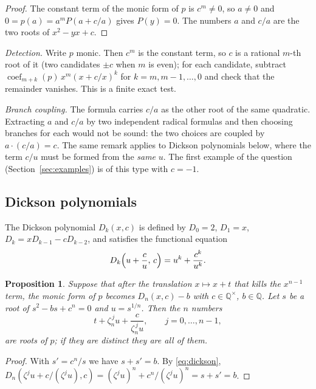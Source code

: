 \documentclass[11pt,a4paper]{article}
\newtheorem{proposition}[theorem]{Proposition}
\theoremstyle{definition}
\theoremstyle{remark}
\newcommand{\Q}{\mathbb{Q}}
\begin{document}
\begin{proof}
The constant term of the monic form of $p$ is $c^m\neq0$, so $a\neq0$ and
$0=p(a)=a^mP(a+c/a)$ gives $P(y)=0$.  The numbers $a$ and $c/a$ are the two roots of
$x^2-yx+c$.
\end{proof}

\emph{Detection.}  Write $p$ monic.  Then $c^m$ is the constant term, so $c$ is a
rational $m$-th root of it (two candidates $\pm c$ when $m$ is even); for each candidate,
subtract $\operatorname{coef}_{m+k}(p)\,x^m(x+c/x)^k$ for $k=m,m-1,\dots,0$ and check that
the remainder vanishes.  This is a finite exact test.

\emph{Branch coupling.}  The formula carries $c/a$ as the other root of the same
quadratic.  Extracting $a$ and $c/a$ by two independent radical formulas and then
choosing branches for each would not be sound: the two choices are coupled by
$a\cdot(c/a)=c$.  The same remark applies to Dickson polynomials below, where the
term $c/u$ must be formed from the \emph{same} $u$.  The first example of the question
(Section~\ref{sec:examples}) is of this type with $c=-1$.

\subsection{Dickson polynomials}\label{sec:dickson}

The Dickson polynomial $D_k(x,c)$ is defined by $D_0=2$, $D_1=x$,
$D_k=xD_{k-1}-cD_{k-2}$, and satisfies the functional equation
\begin{equation}\label{eq:dickson}
D_k\Bigl(u+\frac{c}{u},\,c\Bigr)=u^k+\frac{c^k}{u^k}.
\end{equation}

\begin{proposition}\label{prop:dickson}
Suppose that after the translation $x\mapsto x+t$ that kills the $x^{n-1}$ term, the monic
form of $p$ becomes $D_n(x,c)-b$ with $c\in\Q^\times$, $b\in\Q$.  Let $s$ be a root of
$s^2-bs+c^n=0$ and $u=s^{1/n}$.  Then the $n$ numbers
\[
t+\zeta_n^{\,j}u+\frac{c}{\zeta_n^{\,j}u},\qquad j=0,\dots,n-1,
\]
are roots of $p$; if they are distinct they are all of them.
\end{proposition}

\begin{proof}
With $s'=c^n/s$ we have $s+s'=b$.  By \eqref{eq:dickson},
$D_n(\zeta^ju+c/(\zeta^ju),c)=(\zeta^ju)^n+c^n/(\zeta^ju)^n=s+s'=b$.
\end{proof}
\end{document}
